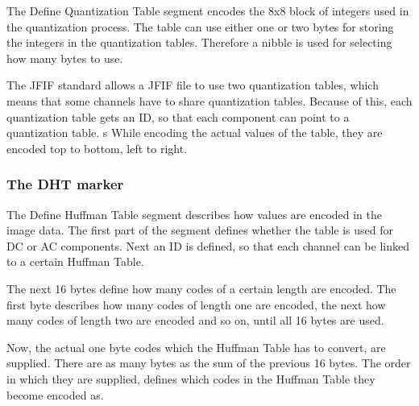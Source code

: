 \begin{infobox}
The Define Quantization Table segment encodes the 8x8 block of integers used in the quantization process. 
The table can use either one or two bytes for storing the integers in the quantization tables. 
Therefore a nibble is used for selecting how many bytes to use.

The JFIF standard allows a JFIF file to use two quantization tables, which means that some channels have to share quantization tables. 
Because of this, each quantization table gets an ID, so that each component can point to a quantization table. 
s
While encoding the actual values of the table, they are encoded top to bottom, left to right.


\subsubsection{The DHT marker}
\begin{centering}
\end{centering}

The Define Huffman Table segment describes how values are encoded in the image data. 
The first part of the segment defines whether the table is used for DC or AC components. Next an ID is defined, so that each channel can be linked to a certain Huffman Table.

The next 16 bytes define how many codes of a certain length are encoded. 
The first byte describes how many codes of length one are encoded, the next how many codes of length two are encoded and so on, until all 16 bytes are used. 

Now, the actual one byte codes which the Huffman Table has to convert, are supplied.
There are as many bytes as the sum of the previous 16 bytes. 
The order in which they are supplied, defines which codes in the Huffman Table they become encoded as.


\end{infobox}
